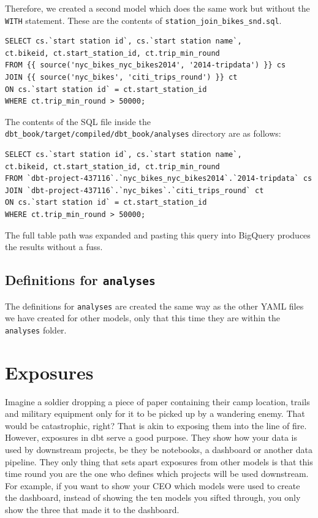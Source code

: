 \documentclass[
]{book}
\begin{document}
Therefore, we created a second model which does the same work but without the \texttt{WITH} statement. These are the contents of \texttt{station\_join\_bikes\_snd.sql}.

\begin{verbatim}
SELECT cs.`start station id`, cs.`start station name`, 
ct.bikeid, ct.start_station_id, ct.trip_min_round 
FROM {{ source('nyc_bikes_nyc_bikes2014', '2014-tripdata') }} cs 
JOIN {{ source('nyc_bikes', 'citi_trips_round') }} ct 
ON cs.`start station id` = ct.start_station_id
WHERE ct.trip_min_round > 50000;
\end{verbatim}

The contents of the SQL file inside the \texttt{dbt\_book/target/compiled/dbt\_book/analyses} directory are as follows:

\begin{verbatim}
SELECT cs.`start station id`, cs.`start station name`, 
ct.bikeid, ct.start_station_id, ct.trip_min_round 
FROM `dbt-project-437116`.`nyc_bikes_nyc_bikes2014`.`2014-tripdata` cs 
JOIN `dbt-project-437116`.`nyc_bikes`.`citi_trips_round` ct 
ON cs.`start station id` = ct.start_station_id
WHERE ct.trip_min_round > 50000;
\end{verbatim}

The full table path was expanded and pasting this query into BigQuery produces the results without a fuss.

\hypertarget{definitions-for-analyses}{%
\section{\texorpdfstring{Definitions for \texttt{analyses}}{Definitions for analyses}}\label{definitions-for-analyses}}

The definitions for \texttt{analyses} are created the same way as the other YAML files we have created for other models, only that this time they are within the \texttt{analyses} folder.

\hypertarget{exposures}{%
\chapter{Exposures}\label{exposures}}

Imagine a soldier dropping a piece of paper containing their camp location, trails and military equipment only for it to be picked up by a wandering enemy. That would be catastrophic, right? That is akin to exposing them into the line of fire. However, exposures in dbt serve a good purpose. They show how your data is used by downstream projects, be they be notebooks, a dashboard or another data pipeline. They only thing that sets apart exposures from other models is that this time round you are the one who defines which projects will be used downstream. For example, if you want to show your CEO which models were used to create the dashboard, instead of showing the ten models you sifted through, you only show the three that made it to the dashboard.
\end{document}
